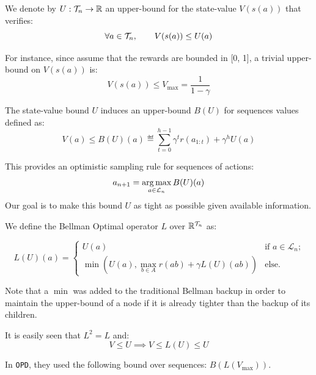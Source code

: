 \documentclass{article}
\begin{document}
\begin{definition}

We denote by $U:\mathcal{T}_n \rightarrow \mathbb{R}$ an upper-bound for the state-value $V(s(a))$ that verifies:
\begin{equation*}
    \forall a\in\mathcal{T}_n, \qquad V(s(a)) \leq U(a)
\end{equation*}

For instance, since assume that the rewards are bounded in [0, 1], a trivial upper-bound on $V(s(a))$ is:
\[V(s(a)) \leq V_{\max} = \frac{1}{1-\gamma} \]

The state-value bound $U$ induces an upper-bound $B(U)$ for sequences values defined as:
\begin{equation}
\label{eq:sequence_value}
    V(a) \leq B(U)(a) \eqdef \sum_{t=0}^{h-1} \gamma^t r(a_{1:t}) + \gamma^{h} U(a)
\end{equation}
\end{definition}

This provides an optimistic sampling rule for sequences of actions:
\begin{equation}
    \label{eq:sampling_rule}
    a_{n+1} = \operatorname*{arg\,max}_{a\in\mathcal{L}_n} B(U)(a)
\end{equation}
Our goal is to make this bound $U$ as tight as possible given available information.

\begin{definition}
We define the Bellman Optimal operator $L$ over $\mathbb{R}^{\mathcal{T}_n}$ as:

\begin{equation}
    L(U)(a) = \begin{cases}
    U(a) & \text{if $a\in\mathcal{L}_n$;} \\
    \min(U(a), \max_{b\in A} r(ab) + \gamma L(U)({ab}))
    & \text{else.}
    \end{cases}
\end{equation}

Note that a $\min$ was added to the traditional Bellman backup in order to maintain the upper-bound of a node if it is already  tighter than the backup of its children.

It is easily seen that $L^2=L$ and:
\begin{equation*}
    V \leq U \implies V \leq L(U) \leq U
\end{equation*}

\end{definition}

In \texttt{OPD}, they used the following bound over sequences: $B\left(L\left(V_{\max}\right)\right)$.
\end{document}
